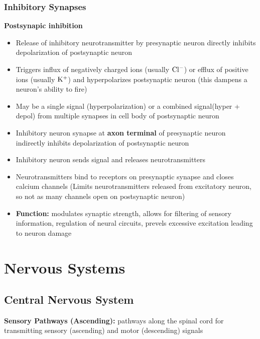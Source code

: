 \documentclass[11pt,fleqn]{book}
\begin{document}
\subsection{Inhibitory Synapses}
\textbf{Postsynapic inhibition}\\
\begin{itemize}
    \item Release of inhibitory neurotransmitter by presynaptic neuron directly inhibits depolarization of postsynaptic neuron
    \item Triggers influx of negatively charged ions (usually ${\rm Cl^-}$) or efflux of positive ions (usually ${\rm K^+}$) and hyperpolarizes postsynaptic neuron  (this dampens a neuron's ability to fire)
    \item May be a single signal (hyperpolarization) or a combined signal(hyper + depol) from multiple synapses in cell body of postsynaptic neuron
    \item Inhibitory neuron synapse at \textbf{axon terminal} of presynaptic neuron indirectly inhibits depolarization of postsynaptic neuron
    \item Inhibitory neuron sends signal and releases neurotransmitters
    \item Neurotransmitters bind to receptors on presynaptic synapse and closes calcium channels (Limits neurotransmitters released from excitatory neuron, so not as many channels open on postsynaptic neuron)
    \item \textbf{Function:} modulates synaptic strength, allows for filtering of sensory information, regulation of neural circuits, prevels excessive excitation leading to neuron damage
\end{itemize}

\chapter{Nervous Systems}
\section{Central Nervous System}
\textbf{Sensory Pathways (Ascending):} pathways along the spinal cord for transmitting sensory (ascending) and motor (descending) signals
\end{document}
